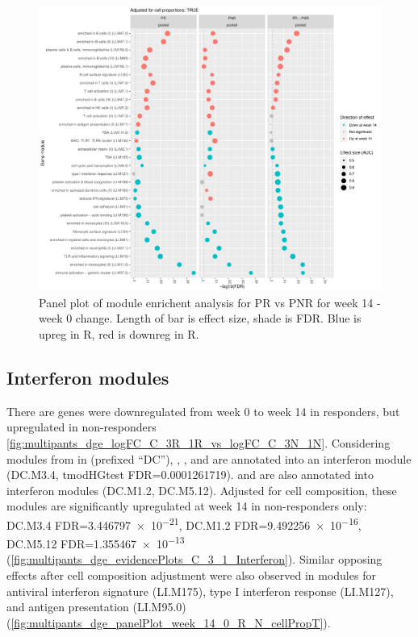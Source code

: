 \begin{outline}
\begin{figure}
    \centering
    \includegraphics[width=1.0\textwidth,page=1]{mainmatter/figures/chapter_04/plot_gene_set_enrichment.tmodCERNO_panelplot_reversed_C_3R_1R,C_3N_1N,C_(3R_1R)_(3N_1N).cell_prop_correction_TRUE.pdf}
    \caption{Panel plot of module enrichent analysis for PR vs PNR for week 14 - week 0 change. Length of bar is effect size, shade is FDR. Blue is upreg in R, red is downreg in R.}
    \label{fig:multipants_dge_panelPlot_week_14_0_R_N_cellPropT}
\end{figure}

\subsection{Interferon modules }

There are genes were downregulated from week 0 to week 14 in responders, but upregulated in non-responders \autoref{fig:multipants_dge_logFC_C_3R_1R_vs_logFC_C_3N_1N}.
Considering modules from \autocite{chaussabel2008ModularAnalysisFramework} in  (prefixed \enquote{DC}),
, , and  are annotated into an interferon module (DC.M3.4, tmodHGtest FDR=\num{0.0001261719}).
 and  are also annotated into interferon modules (DC.M1.2, DC.M5.12).
Adjusted for cell composition, these modules are significantly upregulated at week 14 in non-responders only: 
DC.M3.4
FDR=\num{3.446797e-21},
DC.M1.2
FDR=\num{9.492256e-16},
DC.M5.12
FDR=\num{1.355467e-13}
(\autoref{fig:multipants_dge_evidencePlots_C_3_1_Interferon}).
Similar opposing effects after cell composition adjustment were also observed in \autocite{li2013MolecularSignaturesAntibody} modules for
antiviral interferon signature (LI.M175), type I interferon response (LI.M127), and antigen presentation (LI.M95.0) (\autoref{fig:multipants_dge_panelPlot_week_14_0_R_N_cellPropT}).


\end{outline}
